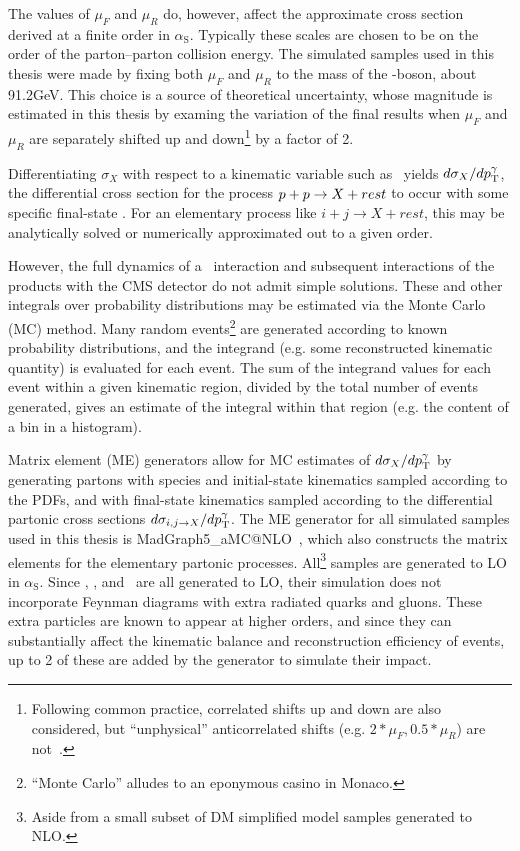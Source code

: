 \documentclass[oneside, letterpaper, 12pt, oldfontcommands]{memoir}
\begin{document}
The values of $\mu_{F}$ and $\mu_{R}$ do, however, affect the approximate cross section derived at a finite order in $\alpha_\mathrm{S}$.
Typically these scales are chosen to be on the order of the parton--parton collision energy.
The simulated samples used in this thesis were made by fixing both $\mu_{F}$ and $\mu_{R}$ to the mass of the \PZ-boson, about 91.2\unit{GeV}.
This choice is a source of theoretical uncertainty, whose magnitude is estimated in this thesis by
examing the variation of the final results when $\mu_{F}$ and $\mu_{R}$ are separately shifted up and down\footnote{Following common practice, correlated shifts up and down
are also considered, but ``unphysical'' anticorrelated shifts (e.g. $2{*}\mu_{F}, 0.5{*}\mu_{R}$) are not~\cite{ref:scalepdf_bendavid}.} by a factor of 2.

Differentiating $\sigma_{X}$ with respect to a kinematic variable such as \pTgamma\ yields $d\sigma_{X}/dp^{\gamma}_\mathrm{T}$, the differential
cross section for the process $p + p \to X + rest$ to occur with some specific final-state \pTgamma.
For an elementary process like $i + j \to X + rest$, this may be analytically solved or numerically approximated out to a given order.

However, the full dynamics of a \Pp\Pp\ interaction and subsequent interactions of the products with the CMS detector do not admit simple solutions.
These and other integrals over probability distributions may be estimated
via the Monte Carlo (MC) method. Many random events\footnote{``Monte Carlo'' alludes to an eponymous casino in Monaco.}
are generated according to known probability distributions,
and the integrand (e.g. some reconstructed kinematic quantity) is evaluated for each event.
The sum of the integrand values for each event within a given kinematic region,
divided by the total number of events generated, gives an estimate of the integral within that region (e.g. the
content of a bin in a histogram).

Matrix element (ME) generators allow for MC estimates of $d\sigma_{X}/dp^{\gamma}_\mathrm{T}$ by generating
partons with species and initial-state kinematics sampled according to the PDFs, and with final-state kinematics sampled
according to the differential partonic cross sections $d\sigma_{i,j \to X}/dp^{\gamma}_\mathrm{T}$.
The ME generator for all simulated samples used in this thesis is MadGraph5\_aMC@NLO~\cite{ref:JHEP07(2014)079},
which also constructs the matrix elements for the elementary partonic processes.
All\footnote{Aside from a small subset of DM simplified model samples generated to NLO.} samples are generated to LO in $\alpha_\mathrm{S}$.
Since \zinvg, \wlng, and \zllg\ are all generated to LO, their simulation does
not incorporate Feynman diagrams with extra radiated quarks and gluons. These extra particles are known
to appear at higher orders, and since they can substantially affect the kinematic balance and reconstruction
efficiency of events, up to 2 of these are added by the generator to simulate their impact.
\end{document}
